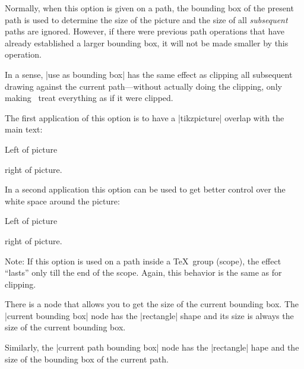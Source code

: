 \begin{itemize}
  Normally, when this option is given on a path, the bounding box of
  the present path is used to determine the size of the picture and
  the size of all \emph{subsequent} paths are
  ignored. However, if there were previous path operations that have
  already established a larger bounding box, it will not be made
  smaller by this operation.

  In a sense, |use as bounding box| has the same effect as clipping
  all subsequent drawing against the current path---without actually
  doing the clipping, only making \pgfname\ treat everything as if it
  were clipped.

  The first application of this option is to have a |{tikzpicture}|
  overlap with the main text:

\begin{codeexample}[]
Left of pictureright of picture.
\end{codeexample}

  In a second application this option can be used to get better
  control over the white space around the picture:
  
\begin{codeexample}[]
Left of picture
right of picture.
\end{codeexample}

  Note: If this option is used on a path inside a \TeX\ group (scope),
  the effect ``lasts'' only till the end of the scope. Again, this
  behavior is the same as for clipping.
\end{itemize}

There is a node that allows you to get the size of the current
bounding box. The |current bounding box| node has the |rectangle|
shape and its size is always the size of the current 
bounding box.

Similarly, the |current path bounding box| node has the |rectangle|
hape and the size of the bounding box of the current path.


\begin{codeexample}[]
\end{codeexample}





